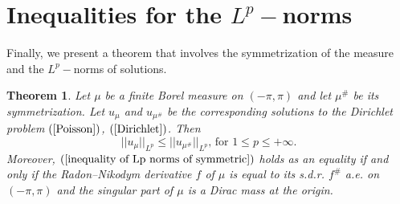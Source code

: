\documentclass[11pt]{amsart}
\newtheorem{theorem}{Theorem}[section]
\numberwithin{equation}{section}
\begin{document}
\section{Inequalities for the \texorpdfstring{\(L^p-\)}{TEXT}norms} 
\par Finally, we present a theorem that involves the symmetrization of the measure and the \(L^p-\)norms of solutions.
\begin{theorem}\label{symmetric Lp norms}
Let \(\mu\) be a finite Borel measure on \((-\pi,\pi)\) and let \(\mu^\#\) be its symmetrization. Let \(u_\mu\) and \(u_{\mu^\#}\) be the corresponding solutions to the Dirichlet problem \((\ref{Poisson})\), \((\ref{Dirichlet})\). Then
\begin{equation}\label{inequality of Lp norms of symmetric}
||u_\mu||_{L^p}\leq||u_{\mu^\#}||_{L^p} \text{, for }1\leq p\leq+\infty.
\end{equation}
Moreover, \((\ref{inequality of Lp norms of symmetric})\) holds as an equality if and only if the Radon--Nikodym derivative \(f\) of \(\mu\) is equal to its s.d.r. \(f^\#\) a.e. on \((-\pi,\pi)\) and the singular part of \(\mu\) is a Dirac mass at the origin.
\end{theorem}
\end{document}
